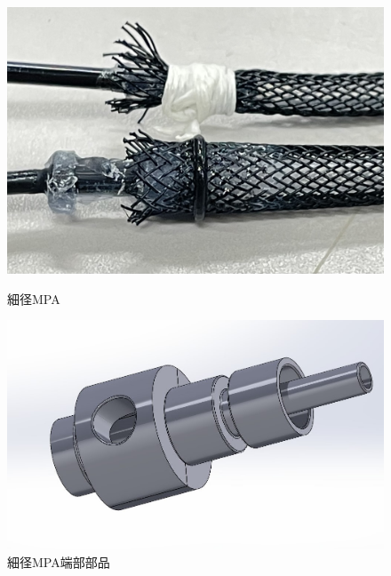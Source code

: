\documentclass{jarticle}
\begin{document}
\begin{figure}[t]
  \begin{minipage}[b]{0.47\columnwidth}
    \centering
    \includegraphics[scale=0.22]{mpa_oring_1.jpg}
    \vspace{-8mm}
    \caption{細径MPA}
    \label{fig:OringMPA}
  \end{minipage}
  \hspace{0.04\columnwidth}
  \begin{minipage}[b]{0.47\columnwidth}
    \centering
    \includegraphics[scale=0.13]{MPAparts.JPG}
    \vspace{-5mm}
    \caption{細径MPA端部部品}
    \label{fig:MPAparts}
  \end{minipage}
\end{figure}
\end{document}
